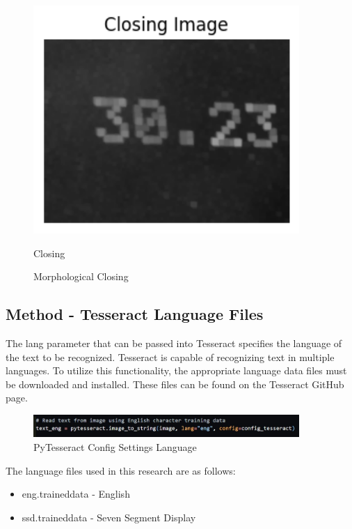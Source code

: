 \begin{figure}[h]
\begin{minipage}{0.30\textwidth}
        \includegraphics[width=0.9\textwidth]{Figures/closing/closing.png}
        \caption*{Closing}
    \end{minipage}
    \caption{Morphological Closing}
\end{figure}

\subsection*{Method - Tesseract Language Files}

The lang parameter that can be passed into Tesseract specifies the language of the text to be recognized. Tesseract is capable of recognizing text in multiple languages. To utilize this functionality, the appropriate language data files must be downloaded and installed. These files can be found on the Tesseract GitHub page. \cite{Tessdata2023}

\begin{figure}[ht]
    \centering
    \includegraphics[width=0.9\textwidth]{Figures/second_run/lang.jpg}
    \caption[PyTesseract Config Settings Language]{PyTesseract Config Settings Language}
    \label{fig:PyTesseract Config Settings - Language}
\end{figure}


The language files used in this research are as follows:

\begin{itemize}
    \item eng.traineddata - English
    \item ssd.traineddata - Seven Segment Display
\end{itemize}



